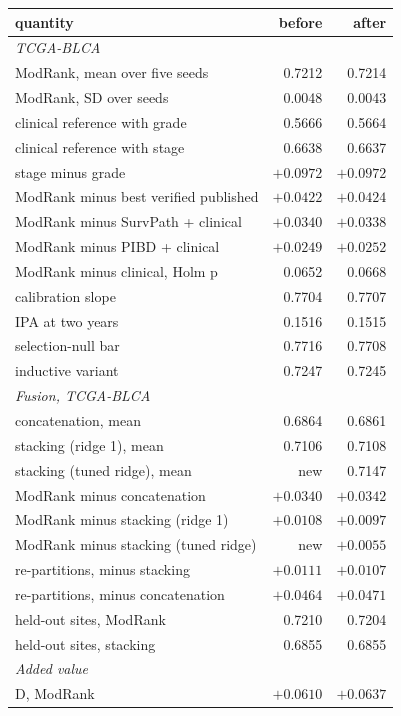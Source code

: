 \documentclass[11pt]{article}
\begin{document}
\begin{table}[h]
\centering
{\small
\begin{tabular}{lrr}
\toprule
quantity & before & after \\
\midrule
\multicolumn{3}{l}{\emph{TCGA-BLCA}} \\
ModRank, mean over five seeds & 0.7212 & 0.7214 \\
ModRank, SD over seeds & 0.0048 & 0.0043 \\
clinical reference with grade & 0.5666 & 0.5664 \\
clinical reference with stage & 0.6638 & 0.6637 \\
stage minus grade & $+0.0972$ & $+0.0972$ \\
ModRank minus best verified published & $+0.0422$ & $+0.0424$ \\
ModRank minus SurvPath + clinical & $+0.0340$ & $+0.0338$ \\
ModRank minus PIBD + clinical & $+0.0249$ & $+0.0252$ \\
ModRank minus clinical, Holm p & 0.0652 & 0.0668 \\
calibration slope & 0.7704 & 0.7707 \\
IPA at two years & 0.1516 & 0.1515 \\
selection-null bar & 0.7716 & 0.7708 \\
inductive variant & 0.7247 & 0.7245 \\
\midrule
\multicolumn{3}{l}{\emph{Fusion, TCGA-BLCA}} \\
concatenation, mean & 0.6864 & 0.6861 \\
stacking (ridge 1), mean & 0.7106 & 0.7108 \\
stacking (tuned ridge), mean & new & 0.7147 \\
ModRank minus concatenation & $+0.0340$ & $+0.0342$ \\
ModRank minus stacking (ridge 1) & $+0.0108$ & $+0.0097$ \\
ModRank minus stacking (tuned ridge) & new & $+0.0055$ \\
re-partitions, minus stacking & $+0.0111$ & $+0.0107$ \\
re-partitions, minus concatenation & $+0.0464$ & $+0.0471$ \\
held-out sites, ModRank & 0.7210 & 0.7204 \\
held-out sites, stacking & 0.6855 & 0.6855 \\
\midrule
\multicolumn{3}{l}{\emph{Added value}} \\
D, ModRank & $+0.0610$ & $+0.0637$ \\

\end{tabular}}
\end{table}
\end{document}
